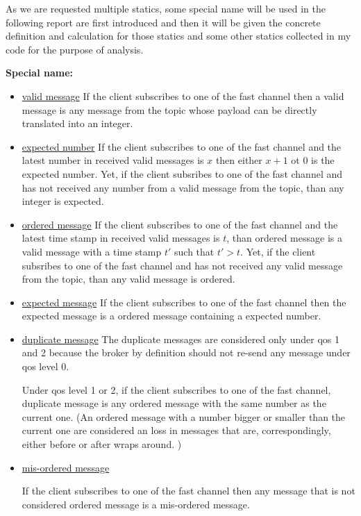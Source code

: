 \documentclass[12pt, letterpaper]{article}
\begin{document}
As we are requested multiple statics, some special name will be used in the following report are first introduced and then it will be given the concrete definition and calculation for those statics and some other statics collected in my code for the purpose of analysis.

\textbf{Special name:}
\begin{itemize}
	\item \underline{valid message}
	If the client subscribes to one of the fast channel then a valid message is any message from the topic whose payload can be directly translated into an integer.
	
	\item \underline{expected number}
	If the client subscribes to one of the fast channel and the latest number in received valid messages is $x$ then either $x+1$ ot $0$ is the expected number. Yet, if the client subsribes to one of the fast channel and has not received any number from a valid message from the topic, than any integer is expected.
		
	\item \underline{ordered message}
	If the client subscribes to one of the fast channel and the latest time stamp in received valid messages is $t$, than ordered message is a valid message with a time stamp $t'$ such that $t' > t$. Yet, if the client subsribes to one of the fast channel and has not received any valid message from the topic, than any valid message is ordered.
	
	\item \underline{expected message}
	If the client subscribes to one of the fast channel then the expected message is a ordered message containing a expected number.
	
	\item \underline{duplicate message}
	The duplicate messages are considered only under qos 1 and 2 because the broker by definition should not re-send any message under qos level 0. 
	
	Under qos level 1 or 2, if the client subscribes to one of the fast channel, duplicate message is any ordered message with the same number as the current one. (An ordered message with a number bigger or smaller than the current one are considered an loss in messages that are, correspondingly, either before or after wraps around. )
	
	\item \underline{mis-ordered message}
	
	If the client subscribes to one of the fast channel then any message that is not considered ordered message is a mis-ordered message.
	
\end{itemize}
\end{document}
